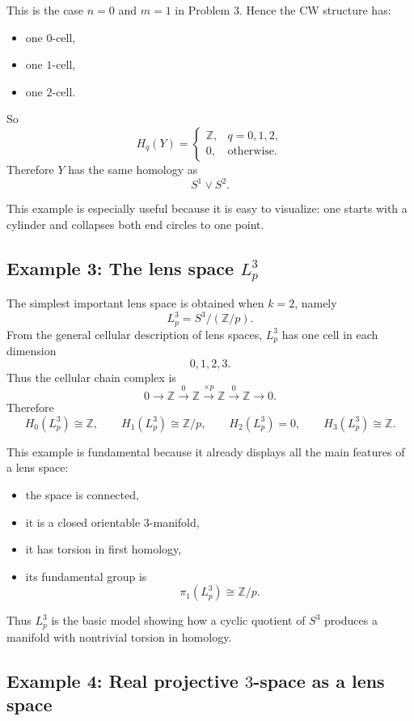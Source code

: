\documentclass[12pt,a4paper]{article}
\theoremstyle{notespace}
\begin{document}
This is the case \(n=0\) and \(m=1\) in Problem 3. Hence the CW structure has:
\begin{itemize}
	\item one \(0\)-cell,
	\item one \(1\)-cell,
	\item one \(2\)-cell.
\end{itemize}
So
\[
H_q(Y)=
\begin{cases}
	\mathbb Z, & q=0,1,2,\\
	0, & \text{otherwise}.
\end{cases}
\]
Therefore \(Y\) has the same homology as
\[
S^1\vee S^2.
\]

This example is especially useful because it is easy to visualize: one starts with a cylinder and collapses both end circles to one point.

\subsection*{Example 3: The lens space \texorpdfstring{$L_p^3$}{Lp3}}

The simplest important lens space is obtained when \(k=2\), namely
\[
L_p^3=S^3/(\mathbb Z/p).
\]
From the general cellular description of lens spaces, \(L_p^3\) has one cell in each dimension
\[
0,1,2,3.
\]
Thus the cellular chain complex is
\[
0\longrightarrow \mathbb Z
\xrightarrow{0}
\mathbb Z
\xrightarrow{\times p}
\mathbb Z
\xrightarrow{0}
\mathbb Z
\longrightarrow 0.
\]
Therefore
\[
H_0(L_p^3)\cong \mathbb Z,
\qquad
H_1(L_p^3)\cong \mathbb Z/p,
\qquad
H_2(L_p^3)=0,
\qquad
H_3(L_p^3)\cong \mathbb Z.
\]

This example is fundamental because it already displays all the main features of a lens space:
\begin{itemize}
	\item the space is connected,
	\item it is a closed orientable \(3\)-manifold,
	\item it has torsion in first homology,
	\item its fundamental group is
	\[
	\pi_1(L_p^3)\cong \mathbb Z/p.
	\]
\end{itemize}

Thus \(L_p^3\) is the basic model showing how a cyclic quotient of \(S^3\) produces a manifold with nontrivial torsion in homology.

\subsection*{Example 4: Real projective \(3\)-space as a lens space}
\end{document}
